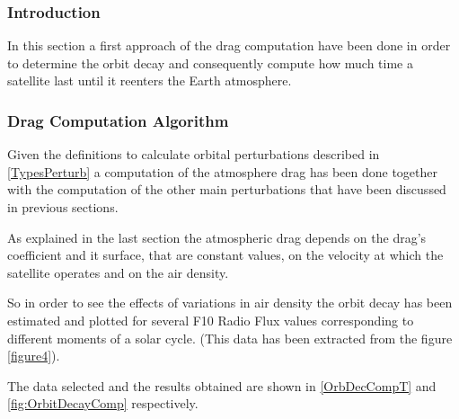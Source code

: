 \subsubsection{Introduction}

In this section a first approach of the drag computation have been done in order to determine the orbit decay and consequently compute how much time a satellite last until it reenters the Earth atmosphere.

\subsubsection{Drag Computation Algorithm}

Given the definitions to calculate orbital perturbations described in \ref{TypesPerturb} a computation of the atmosphere drag has been done together with the computation of the other main perturbations that have been discussed in previous sections.

As explained in the last section the atmospheric drag depends on the drag's coefficient and it surface, that are constant values, on the velocity at which the satellite operates and on the air density.

So in order to see the effects of variations in air density the orbit decay has been estimated and plotted for several F10 Radio Flux values corresponding to different moments of a solar cycle. (This data has been extracted from the figure \ref{figure4}).

The data selected and the results obtained are shown in \ref{OrbDecCompT} and \ref{fig:OrbitDecayComp} respectively.


